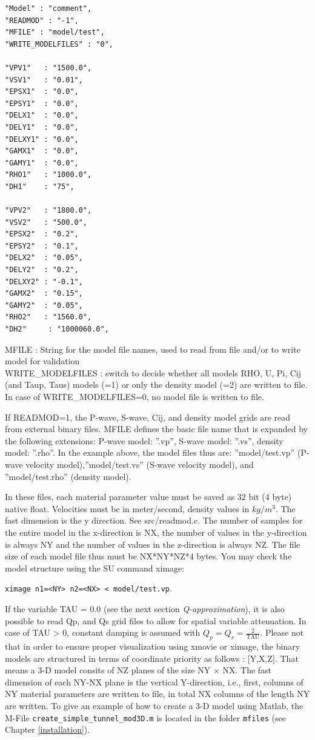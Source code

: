 \documentclass[11pt,onecolumn,oneside]{article}
\begin{document}
\begin{verbatim}
"Model" : "comment",
"READMOD" : "-1",
"MFILE" : "model/test",
"WRITE_MODELFILES" : "0",

"VPV1"   : "1500.0",
"VSV1"   : "0.01",
"EPSX1"  : "0.0",
"EPSY1"  : "0.0",
"DELX1"  : "0.0",
"DELY1"  : "0.0",
"DELXY1" : "0.0",
"GAMX1"  : "0.0",
"GAMY1"  : "0.0",
"RHO1"   : "1000.0",
"DH1"    : "75",

"VPV2"   : "1800.0",
"VSV2"   : "500.0",
"EPSX2"  : "0.2",
"EPSY2"  : "0.1",
"DELX2"  : "0.05",
"DELY2"  : "0.2",
"DELXY2" : "-0.1",
"GAMX2"  : "0.15",
"GAMY2"  : "0.05",
"RHO2"   : "1560.0",
"DH2"     : "1000060.0",
\end{verbatim}
MFILE : String for the model file names, used to read from file and/or to write model for validation \\
WRITE\_MODELFILES : switch to decide whether all models RHO, U, Pi, Cij (and Taup, Taus) models (=1) or only the density model (=2) are written to file. In case of WRITE\_MODELFILES=0, no model file is written to file.

If READMOD=1, the P-wave, S-wave, Cij, and density model grids are read from external binary files. MFILE defines the basic file name that is expanded by the following extensions: P-wave model: ''.vp'', S-wave model: ''.vs'', density model: ''.rho''.  In the example above, the model files thus are: ''model/test.vp'' (P-wave velocity model),''model/test.vs'' (S-wave velocity model), and ''model/test.rho'' (density model). 

In these files, each material parameter value must be saved as 32 bit (4 byte) native float. Velocities must be in meter/second, density values in $kg/m^3$. The fast dimension is the y direction. See src/readmod.c. The number of samples for the entire model in the x-direction is NX, the number of values in the y-direction is always NY  and the number of values in the z-direction is always NZ. The file size of each model file thus must be NX*NY*NZ*4 bytes. You may check the model structure using the SU command ximage:

\lstinline {ximage n1=<NY> n2=<NX> < model/test.vp}.

If the variable TAU = 0.0 (see the next section \textit{Q-approximation}), it is also possible to read Qp, and Qs grid files to allow for spatial variable attenuation. In case of TAU > 0, constant damping is assumed with $Q_p=Q_s = \frac{2}{\mbox{TAU}}$. Please not that in order to ensure proper visualization using xmovie or ximage, the binary models are structured in terms of coordinate priority as follows : [Y,X,Z]. That means a 3-D model consits of NZ planes of the size NY $\times$ NX. The fast dimension of each NY-NX plane is the vertical Y-direction, i.e., first, columns of NY material parameters are written to file, in total NX columns of the length NY are written. To give an example of how to create a 3-D model using Matlab, the M-File  \lstinline{create_simple_tunnel_mod3D.m} is located in the folder  \lstinline{mfiles} (see Chapter \ref{installation}).
\end{document}
